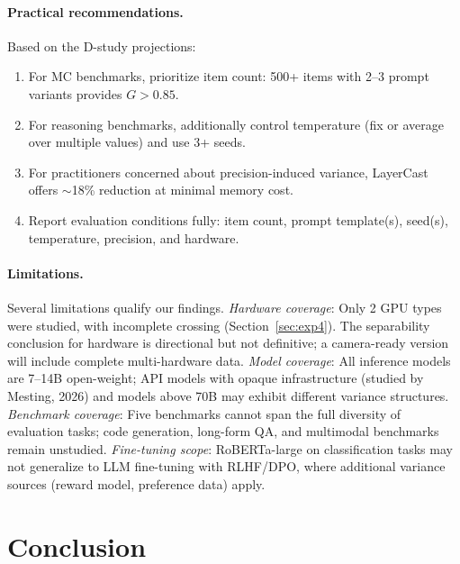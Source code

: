 \documentclass[11pt]{article}
\newcommand{\gcoeff}{G}
\begin{document}
\paragraph{Practical recommendations.}
Based on the D-study projections:
\begin{enumerate}
    \item For MC benchmarks, prioritize item count: 500+ items with 2--3 prompt variants provides $\gcoeff > 0.85$.
    \item For reasoning benchmarks, additionally control temperature (fix or average over multiple values) and use 3+ seeds.
    \item For practitioners concerned about precision-induced variance, LayerCast offers $\sim$18\% reduction at minimal memory cost.
    \item Report evaluation conditions fully: item count, prompt template(s), seed(s), temperature, precision, and hardware.
\end{enumerate}

\paragraph{Limitations.}
Several limitations qualify our findings.
\emph{Hardware coverage}: Only 2 GPU types were studied, with incomplete crossing (Section~\ref{sec:exp4}). The separability conclusion for hardware is directional but not definitive; a camera-ready version will include complete multi-hardware data.
\emph{Model coverage}: All inference models are 7--14B open-weight; API models with opaque infrastructure (studied by Mesting, 2026) and models above 70B may exhibit different variance structures.
\emph{Benchmark coverage}: Five benchmarks cannot span the full diversity of evaluation tasks; code generation, long-form QA, and multimodal benchmarks remain unstudied.
\emph{Fine-tuning scope}: RoBERTa-large on classification tasks may not generalize to LLM fine-tuning with RLHF/DPO, where additional variance sources (reward model, preference data) apply.

\section{Conclusion}
\end{document}
